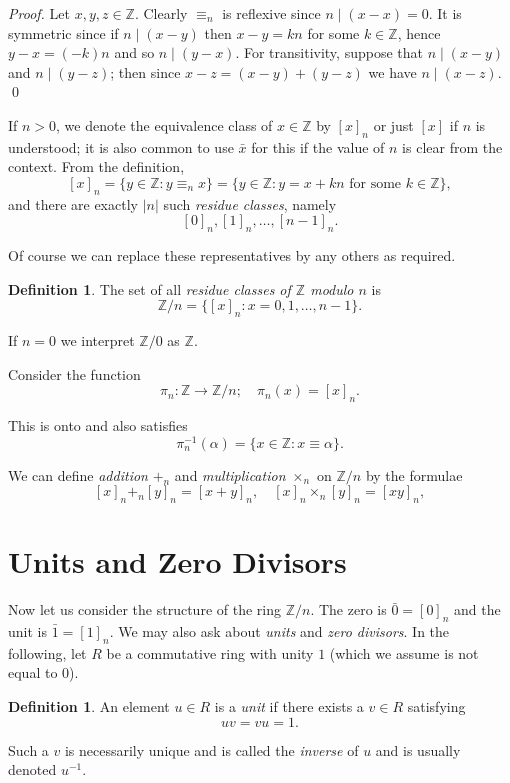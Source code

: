 \documentclass[11pt]{book}
\theoremstyle{plain}
\theoremstyle{definition}
\newtheorem{definition}[theorem]{Definition}
\begin{document}
\begin{proof}
Let $x, y, z \in \mathbb{Z}$. Clearly $\equiv_n$ is reflexive since $n \mid (x - x) = 0$. It is symmetric since if $n \mid (x - y)$ then $x - y = kn$ for some $k \in \mathbb{Z}$, hence $y - x = (-k)n$ and so $n \mid (y - x)$. For transitivity, suppose that $n \mid (x - y)$ and $n \mid (y - z)$; then since $x - z = (x - y) + (y - z)$ we have $n \mid (x - z)$. \qed
\end{proof}

If $n > 0$, we denote the equivalence class of $x \in \mathbb{Z}$ by $[x]_n$ or just $[x]$ if $n$ is understood; it is also common to use $\bar{x}$ for this if the value of $n$ is clear from the context. From the definition,
\[
[x]_n = \{y \in \mathbb{Z} : y \equiv_n x\} = \{y \in \mathbb{Z} : y = x + kn \text{ for some } k \in \mathbb{Z}\},
\]
and there are exactly $|n|$ such \emph{residue classes}, namely
\[
[0]_n, [1]_n, \ldots, [n-1]_n.
\]

Of course we can replace these representatives by any others as required.

\begin{definition}
The set of all \emph{residue classes of $\mathbb{Z}$ modulo $n$} is
\[
\mathbb{Z}/n = \{[x]_n : x = 0, 1, \ldots, n - 1\}.
\]

If $n = 0$ we interpret $\mathbb{Z}/0$ as $\mathbb{Z}$.
\end{definition}

Consider the function
\[
\pi_n : \mathbb{Z} \longrightarrow \mathbb{Z}/n; \quad \pi_n(x) = [x]_n.
\]

This is onto and also satisfies
\[
\pi_n^{-1}(\alpha) = \{x \in \mathbb{Z} : x \equiv \alpha\}.
\]

We can define \emph{addition} $+_n$ and \emph{multiplication} $\times_n$ on $\mathbb{Z}/n$ by the formulae
\[
[x]_n +_n [y]_n = [x + y]_n, \quad [x]_n \times_n [y]_n = [xy]_n,
\]

\section{Units and Zero Divisors}

Now let us consider the structure of the ring $\mathbb{Z}/n$. The zero is $\bar{0} = [0]_n$ and the unit is $\bar{1} = [1]_n$. We may also ask about \emph{units} and \emph{zero divisors}. In the following, let $R$ be a commutative ring with unity $1$ (which we assume is not equal to $0$).

\begin{definition}
An element $u \in R$ is a \emph{unit} if there exists a $v \in R$ satisfying
\[
uv = vu = 1.
\]

Such a $v$ is necessarily unique and is called the \emph{inverse} of $u$ and is usually denoted $u^{-1}$.
\end{definition}
\end{document}
